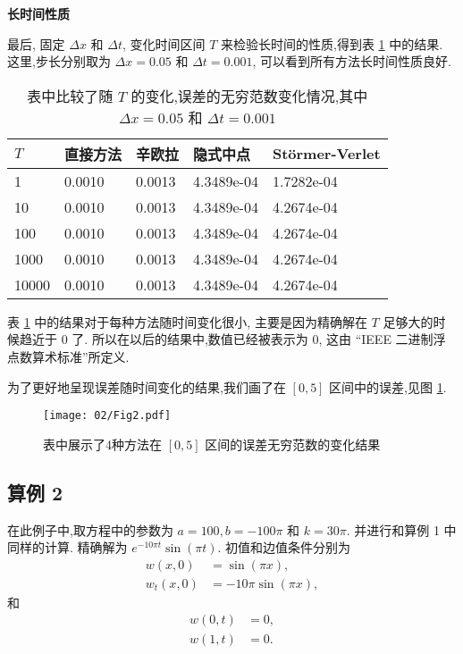 \textbf{长时间性质}

最后, 固定 $\Delta x$ 和 $\Delta t$, 变化时间区间 $T$ 来检验长时间的性质,得到表 \ref{tab:t1} 中的结果. 这里,步长分别取为 $\Delta x = 0.05$ 和 $\Delta t = 0.001$, 可以看到所有方法长时间性质良好.

\begin{table}[h]
  \centering
\caption{表中比较了随 $T$ 的变化,误差的无穷范数变化情况,其中 $\Delta x=0.05$ 和 $\Delta t=0.001$}
\begin{tabularx}{\linewidth}{XXXXX}
 \toprule[1.5pt]
 $T$ &直接方法 & 辛欧拉 & 隐式中点 & St\"{o}rmer-Verlet\\
 \midrule[1pt]
 1 & 0.0010 & 0.0013 & 4.3489e-04 & 1.7282e-04 \\
 10 & 0.0010 & 0.0013 & 4.3489e-04 & 4.2674e-04 \\
 100 & 0.0010 & 0.0013 & 4.3489e-04 & 4.2674e-04 \\
 1000 & 0.0010 & 0.0013 & 4.3489e-04 & 4.2674e-04 \\
 10000 & 0.0010 & 0.0013 & 4.3489e-04 & 4.2674e-04 \\
 \bottomrule[1.5pt]
\end{tabularx}
  \label{tab:t1}
\end{table}

表 \ref{tab:t1} 中的结果对于每种方法随时间变化很小, 主要是因为精确解在 $T$ 足够大的时候趋近于 $0$ 了. 所以在以后的结果中,数值已经被表示为 $0$, 这由 ``IEEE 二进制浮点数算术标准''所定义.

为了更好地呈现误差随时间变化的结果,我们画了在 $[0,5]$ 区间中的误差,见图 \ref{fig:err1}.

\begin{figure}[h]
    \centering
    \texttt{[image: 02/Fig2.pdf]}
    \caption{表中展示了4种方法在 $[0,5]$ 区间的误差无穷范数的变化结果}
    \label{fig:err1}
\end{figure}


\subsection*{算例 2}
在此例子中,取方程中的参数为 $a = 100, b
=-100\pi$ 和 $k =30\pi$. 并进行和算例 1 中同样的计算.
精确解为 $e^{-10\pi t}\sin(\pi t)$. 初值和边值条件分别为
\begin{equation*}
\begin{aligned}
w(x,0)&=\sin(\pi x),\\
w_t(x,0)&=-10 \pi \sin(\pi x),
\end{aligned}
\end{equation*}
和
\begin{equation*}
\begin{aligned}
w(0,t)&=0,\\
w(1,t)&=0.
\end{aligned}
\end{equation*}

